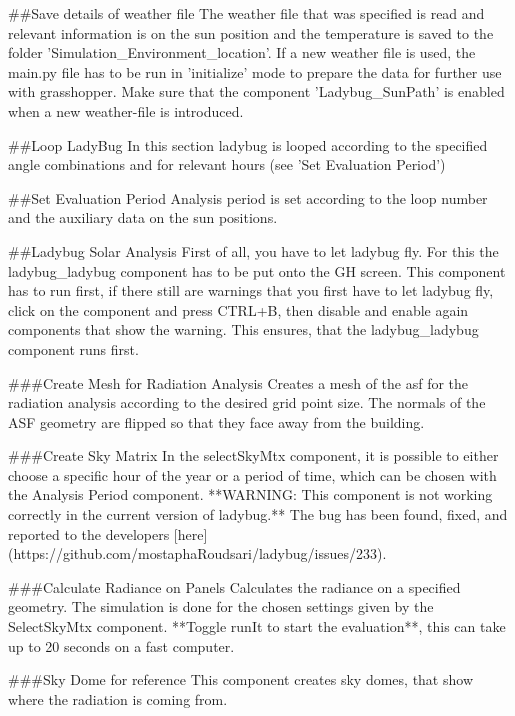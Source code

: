 	##Save details of weather file
	The weather file that was specified is read and relevant information is on the sun position and the temperature is saved to the folder 'Simulation_Environment\data\geographical_location'. If a new weather file is used, the main.py file has to be run in 'initialize' mode to prepare the data for further use with grasshopper. Make sure that the component 'Ladybug_SunPath' is enabled when a new weather-file is introduced. 


	##Loop LadyBug
	In this section ladybug is looped according to the specified angle combinations and for relevant hours (see 'Set Evaluation Period')


	##Set Evaluation Period
	Analysis period is set according to the loop number and the auxiliary data on the sun positions. 

	##Ladybug Solar Analysis
	First of all, you have to let ladybug fly. For this the ladybug_ladybug component has to be put onto the GH screen. This component has to run first, if there still are warnings that you first have to let ladybug fly, click on the component and press CTRL+B, then disable and enable again components that show the warning. This ensures, that the ladybug_ladybug component runs first. 

	###Create Mesh for Radiation Analysis
	Creates a mesh of the asf for the radiation analysis according to the desired grid point size. The normals of the ASF geometry are flipped so that they face away from the building. 

	###Create Sky Matrix
	In the selectSkyMtx component, it is possible to either choose a specific hour of the year or a period of time, which can be chosen with the Analysis Period component. **WARNING: This component is not working correctly in the current version of ladybug.** The bug has been found, fixed, and reported to the developers [here](https://github.com/mostaphaRoudsari/ladybug/issues/233). 

	###Calculate Radiance on Panels
	Calculates the radiance on a specified geometry. The simulation is done for the chosen settings given by the SelectSkyMtx component. **Toggle runIt to start the evaluation**, this can take up to 20 seconds on a fast computer. 

	###Sky Dome for reference
	This component creates sky domes, that show where the radiation is coming from. 



